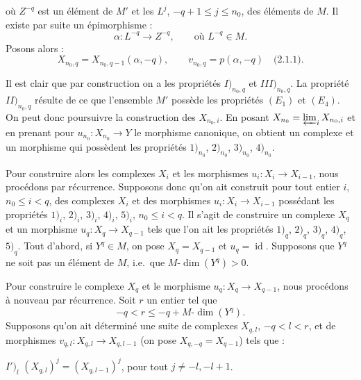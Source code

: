 \clearpage
{}%
\begingroup\small\setlength{\parskip}{0pt}\setlength{\emergencystretch}{1.5em}
\setlength{\abovedisplayskip}{4pt plus 2pt minus 2pt}%
\setlength{\belowdisplayskip}{4pt plus 2pt minus 2pt}%

où $Z^{-q}$ est un élément de $M'$ et les $L^j$,
$-q+1\leq j\leq n_0$, des éléments de $M$. Il existe par suite un
épimorphisme :
\[
\alpha\colon L^{-q}\longrightarrow Z^{-q},
\qquad\text{où }L^{-q}\in M.
\]
Posons alors :
\[
X_{n_0,q}=X_{n_0,q-1}(\alpha,-q),
\qquad
v_{n_0,q}=p(\alpha,-q)\quad\text{(2.1.1)}.
\]

Il est clair que par construction on a les propriétés
$I)_{n_0,q}$ et $III)_{n_0,q}$. La propriété
$II)_{n_0,q}$ résulte de ce que l'ensemble $M'$ possède les
propriétés $(E_1)$ et $(E_4)$. On peut donc poursuivre la construction des
$X_{n_0,i}$. En posant
$X_{n_0}=\varprojlim_i X_{n_0,i}$ et en prenant pour
$u_{n_0}\colon X_{n_0}\longrightarrow Y$ le morphisme canonique, on
obtient un complexe et un morphisme qui possèdent les propriétés
$1)_{n_0}$, $2)_{n_0}$, $3)_{n_0}$, $4)_{n_0}$.

Pour construire alors les complexes $X_i$ et les morphismes
$u_i\colon X_i\longrightarrow X_{i-1}$, nous procédons par récurrence.
Supposons donc qu'on ait construit pour tout entier $i$, $n_0\leq i<q$,
des complexes $X_i$ et des morphismes
$u_i\colon X_i\longrightarrow X_{i-1}$ possédant les propriétés
$1)_i$, $2)_i$, $3)_i$, $4)_i$, $5)_i$, $n_0\leq i<q$. Il s'agit de
construire un complexe $X_q$ et un morphisme
$u_q\colon X_q\longrightarrow X_{q-1}$ tels que l'on ait les propriétés
$1)_q$, $2)_q$, $3)_q$, $4)_q$, $5)_q$. Tout d'abord, si $Y^q\in M$, on
pose $X_q=X_{q-1}$ et $u_q=\operatorname{id}$. Supposons que $Y^q$ ne
soit pas un élément de $M$, i.e.\ que $M\text{-}\dim(Y^q)>0$.

Pour construire le complexe $X_q$ et le morphisme
$u_q\colon X_q\longrightarrow X_{q-1}$, nous procédons à nouveau par
récurrence. Soit $r$ un entier tel que
\[
-q<r\leq -q+M\text{-}\dim(Y^q).
\]
Supposons qu'on ait déterminé une suite de complexes $X_{q,l}$,
$-q<l<r$, et de morphismes
$v_{q,l}\colon X_{q,l}\longrightarrow X_{q,l-1}$ (on pose
$X_{q,-q}=X_{q-1}$) tels que :

\noindent$I')_l$
$(X_{q,l})^j=(X_{q,l-1})^j$, pour tout $j\neq-l,-l+1$.

